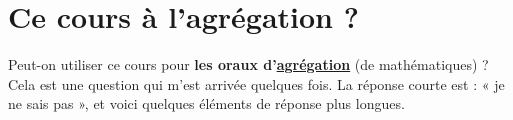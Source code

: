 
\section*{Ce cours à l'agrégation ?}

Peut-on utiliser ce cours pour \textbf{les oraux d'\href{http://agreg.org/}{agrégation}} (de mathématiques) ?  Cela est une question qui m'est arrivée quelques fois.  La réponse courte est : « je ne sais pas », et voici quelques éléments de réponse plus longues.

